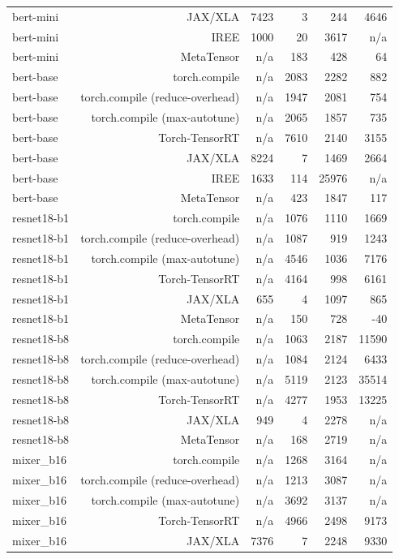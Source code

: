 \begin{tabular}{lrrrrr}
bert-mini & JAX/XLA & 7423 & 3 & 244 & 4646 \\
bert-mini & IREE & 1000 & 20 & 3617 & n/a \\
bert-mini & MetaTensor & n/a & 183 & 428 & 64 \\
bert-base & torch.compile & n/a & 2083 & 2282 & 882 \\
bert-base & torch.compile (reduce-overhead) & n/a & 1947 & 2081 & 754 \\
bert-base & torch.compile (max-autotune) & n/a & 2065 & 1857 & 735 \\
bert-base & Torch-TensorRT & n/a & 7610 & 2140 & 3155 \\
bert-base & JAX/XLA & 8224 & 7 & 1469 & 2664 \\
bert-base & IREE & 1633 & 114 & 25976 & n/a \\
bert-base & MetaTensor & n/a & 423 & 1847 & 117 \\
resnet18-b1 & torch.compile & n/a & 1076 & 1110 & 1669 \\
resnet18-b1 & torch.compile (reduce-overhead) & n/a & 1087 & 919 & 1243 \\
resnet18-b1 & torch.compile (max-autotune) & n/a & 4546 & 1036 & 7176 \\
resnet18-b1 & Torch-TensorRT & n/a & 4164 & 998 & 6161 \\
resnet18-b1 & JAX/XLA & 655 & 4 & 1097 & 865 \\
resnet18-b1 & MetaTensor & n/a & 150 & 728 & -40 \\
resnet18-b8 & torch.compile & n/a & 1063 & 2187 & 11590 \\
resnet18-b8 & torch.compile (reduce-overhead) & n/a & 1084 & 2124 & 6433 \\
resnet18-b8 & torch.compile (max-autotune) & n/a & 5119 & 2123 & 35514 \\
resnet18-b8 & Torch-TensorRT & n/a & 4277 & 1953 & 13225 \\
resnet18-b8 & JAX/XLA & 949 & 4 & 2278 & n/a \\
resnet18-b8 & MetaTensor & n/a & 168 & 2719 & n/a \\
mixer\_b16 & torch.compile & n/a & 1268 & 3164 & n/a \\
mixer\_b16 & torch.compile (reduce-overhead) & n/a & 1213 & 3087 & n/a \\
mixer\_b16 & torch.compile (max-autotune) & n/a & 3692 & 3137 & n/a \\
mixer\_b16 & Torch-TensorRT & n/a & 4966 & 2498 & 9173 \\
mixer\_b16 & JAX/XLA & 7376 & 7 & 2248 & 9330 \\

\end{tabular}
